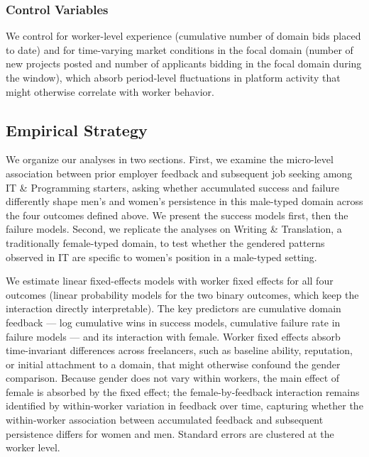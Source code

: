 \documentclass[12pt]{article}
\begin{document}
\subsubsection{Control Variables}

We control for worker-level experience (cumulative number of domain bids placed to date) and for time-varying market conditions in the focal domain (number of new projects posted and number of applicants bidding in the focal domain during the window), which absorb period-level fluctuations in platform activity that might otherwise correlate with worker behavior.

\subsection{Empirical Strategy}

We organize our analyses in two sections. First, we examine the micro-level association between prior employer feedback and subsequent job seeking among IT \& Programming starters, asking whether accumulated success and failure differently shape men's and women's persistence in this male-typed domain across the four outcomes defined above. We present the success models first, then the failure models. Second, we replicate the analyses on Writing \& Translation, a traditionally female-typed domain, to test whether the gendered patterns observed in IT are specific to women's position in a male-typed setting.

We estimate linear fixed-effects models with worker fixed effects for all four outcomes (linear probability models for the two binary outcomes, which keep the interaction directly interpretable). The key predictors are cumulative domain feedback --- log cumulative wins in success models, cumulative failure rate in failure models --- and its interaction with female. Worker fixed effects absorb time-invariant differences across freelancers, such as baseline ability, reputation, or initial attachment to a domain, that might otherwise confound the gender comparison. Because gender does not vary within workers, the main effect of female is absorbed by the fixed effect; the female-by-feedback interaction remains identified by within-worker variation in feedback over time, capturing whether the within-worker association between accumulated feedback and subsequent persistence differs for women and men. Standard errors are clustered at the worker level.


\end{document}
